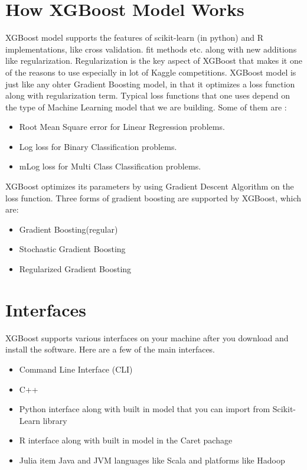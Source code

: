 \section{How XGBoost Model Works}

XGBoost model supports the features of scikit-learn (in python) and R
implementations, like cross validation. fit methods etc. along with new
additions like regularization.  Regularization is the key aspect of XGBoost that
makes it one of the reasons to use especially in  lot of Kaggle competitions.
XGBoost model is just like any ohter Gradient Boosting model, in that it
optimizes a loss function  along with regularization term. Typical loss
functions that one uses depend on the type of Machine Learning model that we are
building. Some of them are :

\begin{itemize}
\item Root Mean Square error for Linear Regression problems. 
\item Log loss for Binary Classification problems. 
\item mLog loss for Multi Class Classification problems.
\end{itemize}

XGBoost optimizes its parameters by using Gradient Descent Algorithm on the loss
function. Three forms of gradient boosting are supported by XGBoost, which are:

\begin{itemize}
\item Gradient Boosting(regular)
\item Stochastic Gradient Boosting
\item Regularized Gradient Boosting 
\end{itemize}



\section{Interfaces}

XGBoost supports various interfaces on your machine after you download and
install the software. Here are a few of the main interfaces.

\begin{itemize}
\item Command Line Interface (CLI)  
\item C++  
\item Python interface along with built in model that you can import 
from Scikit-Learn library   
\item R interface along with built in model in the Caret pachage  
\item Julia item Java and JVM languages like Scala and platforms like Hadoop
\end{itemize}

